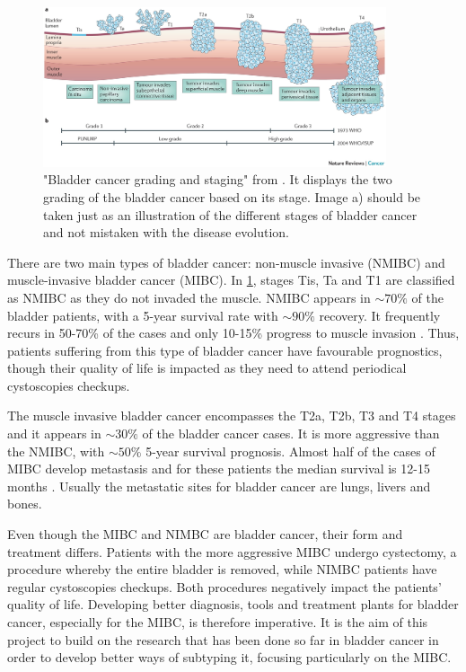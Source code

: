 \begin{figure}[!htb]    
    \centering
\includegraphics[width=0.9\textwidth,height=0.9\textheight,keepaspectratio]{Sections/Lit_review/Resources/bladder_cancer_grading.jpg}
    \caption{"Bladder cancer grading and staging" from \cite{Knowles2015-mu}. It displays the two grading of the bladder cancer based on its stage. Image a) should be taken just as an illustration of the different stages of bladder cancer and not mistaken with the disease evolution. }
    \label{fig:lit:bladder_cancer_stages}
\end{figure}


There are two main types of bladder cancer: non-muscle invasive (NMIBC) and muscle-invasive bladder cancer (MIBC). In \cref{fig:lit:bladder_cancer_stages}, stages Tis, Ta and T1 are classified as NMIBC as they do not invaded the muscle. NMIBC appears in $\sim70\%$ of the bladder patients, with a 5-year survival rate with $\sim90\%$ recovery. It frequently recurs in 50-70\% of the cases and only 10-15\% progress to muscle invasion \cite{Knowles2015-mu}. Thus, patients suffering from this type of bladder cancer have favourable prognostics, though their quality of life is impacted as they need to attend periodical cystoscopies checkups.

The muscle invasive bladder cancer encompasses the T2a, T2b, T3 and T4 stages and it appears in $\sim30\%$ of the bladder cancer cases. It is more aggressive than the NMIBC, with $\sim50\%$ 5-year survival prognosis. Almost half of the cases of MIBC develop metastasis and for these patients the median survival is 12-15 months \cite{Knowles2015-mu}. Usually the metastatic sites for bladder cancer are lungs, livers and bones.

Even though the MIBC and NIMBC are bladder cancer, their form and treatment differs. Patients with the more aggressive MIBC undergo cystectomy, a procedure whereby the entire bladder is removed, while NIMBC patients have regular cystoscopies checkups. Both procedures negatively impact the patients' quality of life. Developing better diagnosis, tools and treatment plants for bladder cancer, especially for the MIBC, is therefore imperative. It is the aim of this project to build on the research that has been done so far in bladder cancer in order to develop better ways of subtyping it, focusing particularly on the MIBC.


